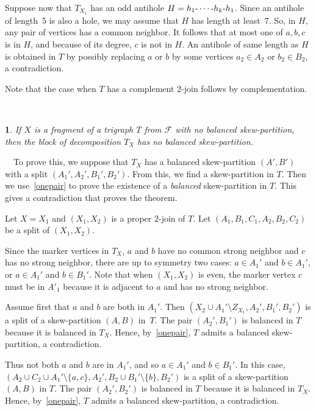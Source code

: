 \documentclass[11 pt] {article}
\newcommand\blackslug{\hbox{\hskip 1pt \vrule width 4pt height 8pt depth 1.5pt
        \hskip 1pt}}
\newcommand\bbox{\hfill \quad \blackslug \medbreak}
\def\d{\hbox{-}}
\def\c{\hbox{-}\cdots\hbox{-}}
\newtheorem{theorem}{}[section]
\newcounter{claim}
\newcommand{\Proof}{\setcounter{claim}{0}\noindent{\bf Proof.}\ \ }
\begin{document}
Suppose now that $T_{X_1}$ has an odd antihole $H = h_1 \c h_k \d
h_1$. Since an antihole of length~5 is also a hole, we may assume that
$H$ has length at least~7. So, in $H$, any pair of vertices has a
common neighbor. It follows that at most one of $a, b, c$ is in $H$,
and because of its degree, $c$ is not in $H$. 
An antihole of same length as $H$ is obtained in
$T$ by possibly replacing $a$ or $b$ by some vertices $a_2 \in
A_2$ or $b_2\in B_2$, a contradiction. 

Note that the case when $T$ has a complement $2$-join follows by complementation.

\bbox


\begin{theorem}\label{stab}
  If $X$ is a fragment of a trigraph $T$ from $\mathcal{F}$ with no
  balanced skew-partition, then the block of decomposition $T_X$ has
  no balanced skew-partition.
\end{theorem}

\Proof To prove this, we suppose that $T_X$ has a balanced skew-partition $(A',B')$ with a split $(A_1',A_2',B_1',B_2')$.  From this,
we find a skew-partition in $T$.  Then we use~\ref{onepair} to prove
the existence of a \emph{balanced} skew-partition in $T$.  This gives
a contradiction that proves the theorem.

Let $X=X_1$ and $(X_1,X_2)$ is a proper $2$-join of
$T$. Let $(A_1,B_1,C_1,A_2,B_2,C_2)$ be a split of $(X_1,X_2)$.

Since the marker vertices in $T_X$, $a$ and $b$ have no common strong
neighbor and $c$ has no strong neighbor, there are up to symmetry two
cases: $a\in A_1'$ and $b\in A_1'$, or $a\in A_1'$ and $b\in
B_1'$. Note that when $(X_1, X_2)$ is even, the marker vertex $c$ must
be in $A'_1$ because it is adjacent to $a$ and has no strong neighbor.

Assume first that $a$ and $b$ are both in $A_1'$. Then $(X_2 \cup A_1'
\setminus Z_{X_1}, A_2', B_1', B_2')$ is a split of a skew-partition $(A,B)$ in~$T$.  The pair $(A_2', B_1')$ is
balanced in $T$ because it is balanced in $T_X$.  Hence,
by~\ref{onepair}, $T$ admits a balanced skew-partition, a
contradiction.  


Thus not both $a$ and $b$ are in $A_1'$, and so $a\in A_1'$ and $b\in
B_1'$. In this case, $(A_2 \cup C_2 \cup A_1' \setminus \{a, c\},
A_2', B_2 \cup B_1'\setminus\{b\}, B_2')$ is a split of a skew-partition $(A,B)$ in $T$.  The pair $(A_2', B_2')$ is
balanced in $T$ because it is balanced in $T_X$.  Hence,
by~\ref{onepair}, $T$ admits a balanced skew-partition, a
contradiction.   
\end{document}
